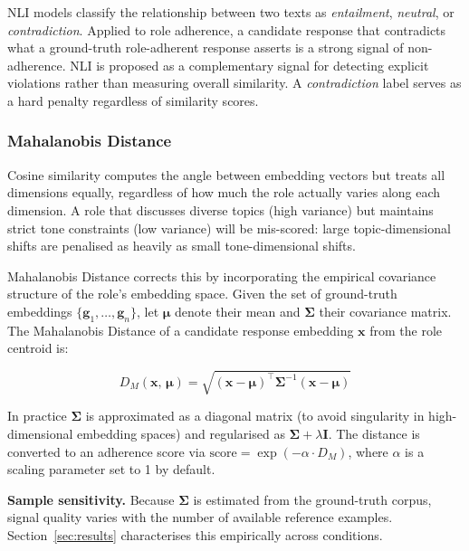 \documentclass[11pt,a4paper]{article}
\begin{document}
NLI models \citep{bowman2015snli} classify the relationship between two texts
as \emph{entailment}, \emph{neutral}, or \emph{contradiction}. Applied to role
adherence, a candidate response that contradicts what a ground-truth
role-adherent response asserts is a strong signal of non-adherence. NLI is
proposed as a complementary signal for detecting explicit violations rather
than measuring overall similarity. A \emph{contradiction} label serves as a
hard penalty regardless of similarity scores.

\subsubsection{Mahalanobis Distance}

Cosine similarity computes the angle between embedding vectors but treats all
dimensions equally, regardless of how much the role actually varies along each
dimension. A role that discusses diverse topics (high variance) but maintains
strict tone constraints (low variance) will be mis-scored: large
topic-dimensional shifts are penalised as heavily as small tone-dimensional
shifts.

Mahalanobis Distance \citep{mahalanobis1936generalised} corrects this by
incorporating the empirical covariance structure of the role's embedding space.
Given the set of ground-truth embeddings $\{\mathbf{g}_1, \ldots,
\mathbf{g}_n\}$, let $\boldsymbol{\mu}$ denote their mean and $\boldsymbol{\Sigma}$
their covariance matrix. The Mahalanobis Distance of a candidate response
embedding $\mathbf{x}$ from the role centroid is:

\begin{equation}
  D_M(\mathbf{x},\, \boldsymbol{\mu}) =
  \sqrt{(\mathbf{x} - \boldsymbol{\mu})^{\top}
  \boldsymbol{\Sigma}^{-1}
  (\mathbf{x} - \boldsymbol{\mu})}
  \label{eq:mahal}
\end{equation}

In practice $\boldsymbol{\Sigma}$ is approximated as a diagonal matrix (to
avoid singularity in high-dimensional embedding spaces) and regularised as
$\boldsymbol{\Sigma} + \lambda \mathbf{I}$. The distance is converted to an
adherence score via $\text{score} = \exp(-\alpha \cdot D_M)$, where $\alpha$
is a scaling parameter set to 1 by default.

\textbf{Sample sensitivity.} Because $\boldsymbol{\Sigma}$ is estimated from
the ground-truth corpus, signal quality varies with the number of available
reference examples. Section~\ref{sec:results} characterises this empirically
across conditions.
\end{document}
